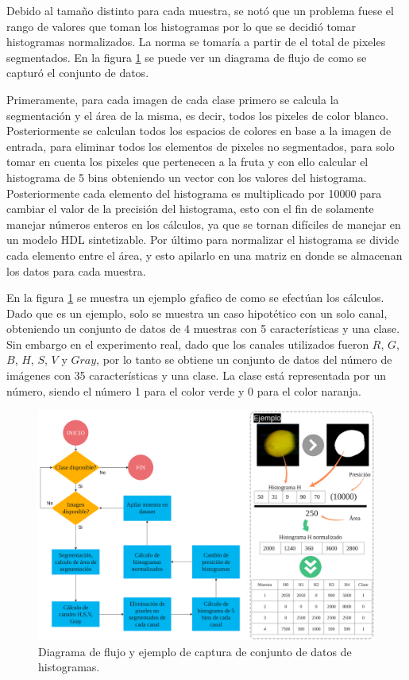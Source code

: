 \documentclass[twoside,spanish,ESP,MSc]{plantillaLabUPV}
\theoremstyle{definition}
\begin{document}
Debido al tamaño distinto para cada muestra, se notó que un problema fuese el rango de valores que toman los histogramas por lo que se decidió tomar histogramas normalizados. La norma se tomaría a partir de el total de pixeles segmentados. En la figura \ref{fig:dscolor} se puede ver un diagrama de flujo de como se capturó el conjunto de datos. 

Primeramente, para cada imagen de cada clase primero se calcula la segmentación y el área de la misma, es decir, todos los pixeles de color blanco. Posteriormente se calculan todos los espacios de colores en base a la imagen de entrada, para eliminar todos los elementos de pixeles no segmentados, para solo tomar en cuenta los pixeles que pertenecen a la fruta y con ello calcular el histograma de 5 bins obteniendo un vector con los valores del histograma. Posteriormente cada elemento del histograma es multiplicado por 10000 para cambiar el valor de la precisión del histograma, esto con el fin de solamente manejar números enteros en los cálculos, ya que se tornan difíciles de manejar en un modelo HDL sintetizable. Por último para normalizar el histograma se divide cada elemento entre el área, y esto apilarlo en una matriz en donde se almacenan los datos para cada muestra. 

En la figura \ref{fig:dscolor} se muestra un ejemplo gŕafico de como se efectúan los cálculos. Dado que es un ejemplo, solo se muestra un caso hipotético con un solo canal, obteniendo un conjunto de datos de 4 muestras con 5 características y una clase. Sin embargo en el experimento real, dado que los canales utilizados fueron $R$, $G$, $B$, $H$, $S$, $V$ y $Gray$, por lo tanto se obtiene un conjunto de datos del número de imágenes con 35 características y una clase. La clase está representada por un número, siendo el número 1 para el color verde y 0 para el color naranja.

\begin{figure}
	\centering
	\includegraphics[width=0.9\linewidth]{edrawimas/dscolor}
	\caption{Diagrama de flujo y ejemplo de captura de conjunto de datos de histogramas.}
	\label{fig:dscolor}
\end{figure}
\end{document}
